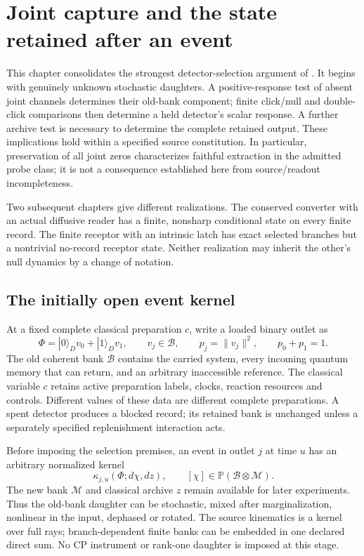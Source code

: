 \documentclass[11pt,oneside,openany]{book}
\theoremstyle{definition}
\theoremstyle{remark}\newtheorem{remark}[theorem]{Remark}
\begin{document}
\chapter{Joint capture and the state retained after an event}
\label{det:chapter-capture}

This chapter consolidates the strongest detector-selection argument of
\cite{M15,M16}. It begins with genuinely unknown stochastic daughters. A
positive-response test of absent joint channels determines their old-bank
component; finite click/null and double-click comparisons then determine a
held detector's scalar response. A further archive test is necessary to
determine the complete retained output. These implications hold within a
specified source constitution. In particular, preservation of all joint
zeros characterizes faithful extraction in the admitted probe class; it is
not a consequence established here from source/readout incompleteness.

Two subsequent chapters give different realizations. The conserved
converter with an actual diffusive reader has a finite, nonsharp conditional
state on every finite record. The finite receptor with an intrinsic latch
has exact selected branches but a nontrivial no-record receptor state.
Neither realization may inherit the other's null dynamics by a change of
notation.

\section{The initially open event kernel}

At a fixed complete classical preparation $c$, write a loaded binary outlet
as
\begin{equation}
 \Phi=|0\rangle_D v_0+|1\rangle_D v_1,
 \qquad v_j\in\mathcal B,
 \qquad p_j=\|v_j\|^2,
 \qquad p_0+p_1=1.                         \label{det:rows}
\end{equation}
The old coherent bank $\mathcal B$ contains the carried system, every
incoming quantum memory that can return, and an arbitrary inaccessible
reference. The classical variable $c$ retains active preparation labels,
clocks, reaction resources and controls. Different values of these data
are different complete preparations. A spent detector produces a blocked
record; its retained bank is unchanged unless a separately specified
replenishment interaction acts.

Before imposing the selection premises, an event in outlet $j$ at time $u$
has an arbitrary normalized kernel
\begin{equation}
 \kappa_{j,u}(\Phi;d\chi,dz),
 \qquad [\chi]\in\mathbb P(\mathcal B\otimes\mathcal M).       \label{det:kernel}
\end{equation}
The new bank $\mathcal M$ and classical archive $z$ remain available for
later experiments. Thus the old-bank daughter can be stochastic, mixed
after marginalization, nonlinear in the input, dephased or rotated.
The source kinematics is a kernel over full rays; branch-dependent finite
banks can be embedded in one declared direct sum. No CP instrument or
rank-one daughter is imposed at this stage.
\end{document}
